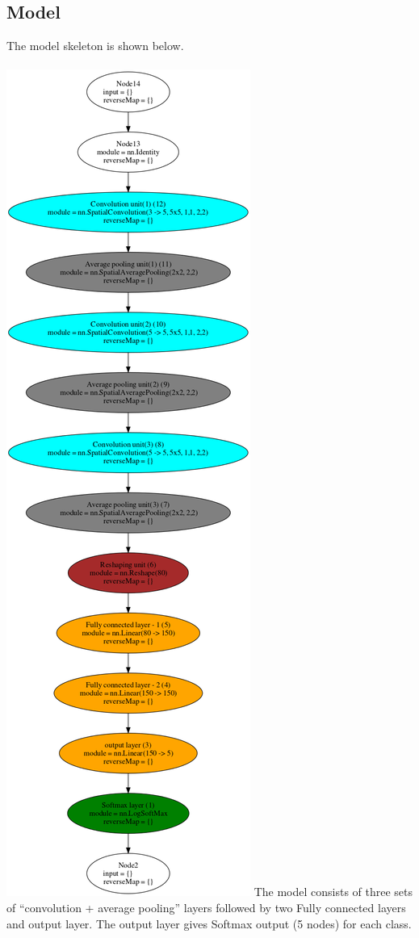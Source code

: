 \documentclass[fleqn]{article}
\begin{document}
\subsection{Model}
The model skeleton is shown below.\\\\
\includegraphics[scale=0.3]{./pics/filt=5-hidden1=5-hidden2=5-hidden3=5-fc1=150-fc2=150}
\newpage
The model consists of three sets of ``convolution + average pooling'' layers followed by two Fully connected layers and output layer.
The output layer gives Softmax output (5 nodes) for each class.\\\\
\end{document}
